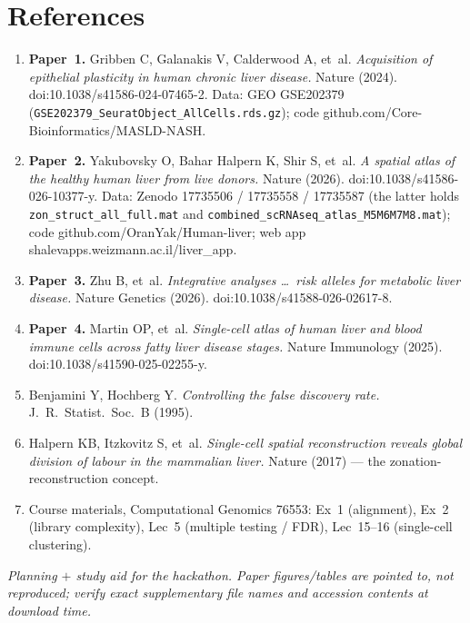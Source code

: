 \documentclass[11pt]{article}
\newcommand{\code}[1]{\texttt{#1}}
\begin{document}
\section{References}

\begin{enumerate}[leftmargin=1.6em]
\item \textbf{Paper~1.} Gribben C, Galanakis V, Calderwood A, et~al. \emph{Acquisition of epithelial
plasticity in human chronic liver disease.} Nature (2024). doi:10.1038/s41586-024-07465-2. Data: GEO
GSE202379 (\code{GSE202379\_SeuratObject\_AllCells.rds.gz}); code
github.com/Core-Bioinformatics/MASLD-NASH.
\item \textbf{Paper~2.} Yakubovsky O, Bahar Halpern K, Shir S, et~al. \emph{A spatial atlas of the
healthy human liver from live donors.} Nature (2026). doi:10.1038/s41586-026-10377-y. Data: Zenodo
17735506 / 17735558 / 17735587 (the latter holds \code{zon\_struct\_all\_full.mat} and
\code{combined\_scRNAseq\_atlas\_M5M6M7M8.mat}); code github.com/OranYak/Human-liver; web app
shalevapps.weizmann.ac.il/liver\_app.
\item \textbf{Paper~3.} Zhu B, et~al. \emph{Integrative analyses \ldots\ risk alleles for metabolic
liver disease.} Nature Genetics (2026). doi:10.1038/s41588-026-02617-8.
\item \textbf{Paper~4.} Martin OP, et~al. \emph{Single-cell atlas of human liver and blood immune cells
across fatty liver disease stages.} Nature Immunology (2025). doi:10.1038/s41590-025-02255-y.
\item Benjamini Y, Hochberg Y. \emph{Controlling the false discovery rate.} J.\ R.\ Statist.\ Soc.\ B
(1995).
\item Halpern KB, Itzkovitz S, et~al. \emph{Single-cell spatial reconstruction reveals global division
of labour in the mammalian liver.} Nature (2017) --- the zonation-reconstruction concept.
\item Course materials, Computational Genomics 76553: Ex~1 (alignment), Ex~2 (library complexity),
Lec~5 (multiple testing / FDR), Lec~15--16 (single-cell clustering).
\end{enumerate}

\bigskip
\noindent\textit{\small Planning $+$ study aid for the hackathon. Paper figures/tables are pointed to,
not reproduced; verify exact supplementary file names and accession contents at download time.}
\end{document}
